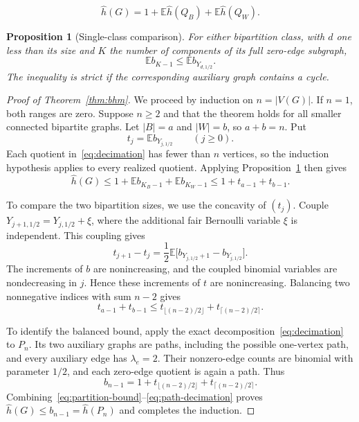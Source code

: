 \documentclass[10pt,a4paper]{amsart}
\newtheorem{proposition}[theorem]{Proposition}
\theoremstyle{remark}
\numberwithin{equation}{section}
\newcommand{\E}{\mathbb E}
\begin{document}
\setcounter{section}{2}
\setcounter{equation}{3}
\setcounter{theorem}{3}
\begin{equation}\label{eq:decimation}
 \widehat h(G)=1+\E\widehat h(Q_B)+\E\widehat h(Q_W).
\end{equation}

\setcounter{section}{4}
\setcounter{equation}{11}
\setcounter{theorem}{3}
\begin{proposition}[Single-class comparison]\label{prop:single-class}
For either bipartition class, with $d$ one less than its size and $K$
the number of components of its full zero-edge subgraph,
\begin{equation}\label{eq:single-class}
 \E b_{K-1}\le\E b_{Y_{d,1/2}}.
\end{equation}
The inequality is strict if the corresponding auxiliary graph contains
a cycle.
\end{proposition}

\setcounter{section}{4}
\setcounter{equation}{12}
\setcounter{theorem}{4}
\begin{proof}[Proof of Theorem~\ref{thm:bhm}]
We proceed by induction on $n=|V(G)|$. If $n=1$, both ranges are zero.
Suppose
$n\ge2$ and that the theorem holds for all smaller connected bipartite
graphs. Let $|B|=a$ and $|W|=b$, so $a+b=n$. Put
\[
 t_j=\E b_{Y_{j,1/2}}\qquad(j\ge0).
\]
Each quotient in~\eqref{eq:decimation} has fewer than $n$ vertices, so
the induction hypothesis applies to every realized quotient. Applying
Proposition~\ref{prop:single-class} then gives
\begin{equation}\label{eq:partition-bound}
 \widehat h(G)
 \le1+\E b_{K_B-1}+\E b_{K_W-1}
 \le1+t_{a-1}+t_{b-1}.
\end{equation}

To compare the two bipartition sizes, we use the concavity of $(t_j)$.
Couple $Y_{j+1,1/2}=Y_{j,1/2}+\xi$, where the additional fair Bernoulli
variable $\xi$ is independent. This coupling gives
\[
 t_{j+1}-t_j
   =\frac12\E\bigl[b_{Y_{j,1/2}+1}-b_{Y_{j,1/2}}\bigr].
\]
The increments of $b$ are nonincreasing, and the coupled binomial
variables are nondecreasing in $j$. Hence these increments of $t$ are
nonincreasing. Balancing two nonnegative indices with sum $n-2$ gives
\begin{equation}\label{eq:balance}
 t_{a-1}+t_{b-1}
 \le t_{\lfloor(n-2)/2\rfloor}+t_{\lceil(n-2)/2\rceil}.
\end{equation}

To identify the balanced bound, apply the exact
decomposition~\eqref{eq:decimation} to $P_n$.
Its two auxiliary graphs are paths, including the possible one-vertex
path, and every auxiliary edge has $\lambda_e=2$. Their nonzero-edge
counts are binomial with parameter $1/2$, and each zero-edge quotient
is again a path. Thus
\begin{equation}\label{eq:path-decimation}
 b_{n-1}=1+t_{\lfloor(n-2)/2\rfloor}
           +t_{\lceil(n-2)/2\rceil}.
\end{equation}
Combining~\eqref{eq:partition-bound}--\eqref{eq:path-decimation} proves
$\widehat h(G)\le b_{n-1}=\widehat h(P_n)$ and completes the induction.
\end{proof}
\end{document}
